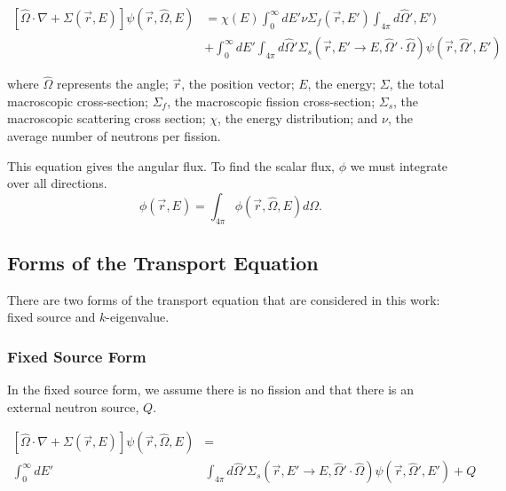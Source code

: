 \begin{equation}
\begin{split}
 [\hat{\Omega} \cdot \nabla + \Sigma(\vec{r}, E)]\psi(\vec{r}, \hat{\Omega}, E) &= \chi(E) \int_0^\infty dE' \nu \Sigma_{f}(\vec{r}, E') \int_{4\pi} d\hat{\Omega}', E') \\   &+ \int_0^\infty dE' \int_{4\pi} d\hat{\Omega}' \Sigma_s(\vec{r}, E' \rightarrow E, \hat{\Omega}' \cdot \hat{\Omega})\psi(\vec{r}, \hat{\Omega}', E')   
\end{split}
\label{eq:transport}
\end{equation}


where $\hat{\Omega}$ represents the angle; $\vec{r}$, the position vector; $E$, the energy; $\Sigma$, the total macroscopic cross-section; $\Sigma_f$, the macroscopic fission cross-section; $\Sigma_s$, the macroscopic scattering cross section; $\chi$, the energy distribution; and $\nu$, the average number of neutrons per fission. 

This equation gives the angular flux. To find the scalar flux, $\phi$ we must integrate over all directions.
\begin{equation}
    \phi(\vec{r}, E) = \int_{4\pi} \phi(\vec{r}, \hat{\Omega}, E) d \Omega.
\end{equation}

\subsection{Forms of the Transport Equation}
There are two forms of the transport equation that are considered in this work: fixed source and $k$-eigenvalue. 

\subsubsection{Fixed Source Form}
In the fixed source form, we assume there is no fission and that there is an external neutron source, $Q$.

\begin{equation}
\begin{split}
 [\hat{\Omega} \cdot \nabla + \Sigma(\vec{r}, E)]\psi(\vec{r}, \hat{\Omega}, E) &= \\ \int_0^\infty dE' &\int_{4\pi} d\hat{\Omega}' \Sigma_s(\vec{r}, E' \rightarrow E, \hat{\Omega}' \cdot \hat{\Omega})\psi(\vec{r}, \hat{\Omega}', E')  +Q 
\end{split}
 \label{eq:transport_fixed_source}
\end{equation}

